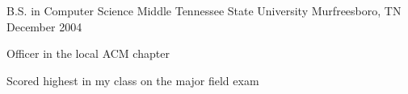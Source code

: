\begin{cventries}
  \cventry
    {B.S. in Computer Science}
    {Middle Tennessee State University}
    {Murfreesboro, TN}
    {December 2004}
    {
      \begin{cvitems}
        \item {Officer in the local ACM chapter}
        \item {Scored highest in my class on the major field exam}
      \end{cvitems}
    }
\end{cventries}
